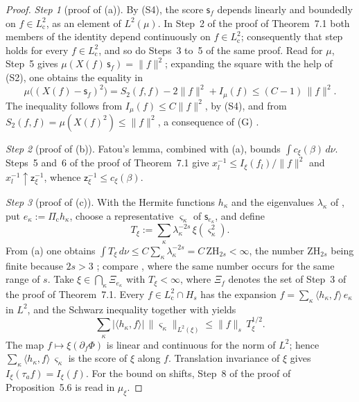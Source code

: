 \documentclass[11pt,letterpaper,reqno]{amsart}
\theoremstyle{definition}
\begin{document}
\begin{proof}
\emph{Step 1} (proof of (a)).
By (S4), the score $\mathsf s_f$ depends linearly and boundedly on $f\in L^2_{\mathrm c}$, as an element of $L^2(\mu)$.
In Step~2 of the proof of Theorem~7.1 both members of the identity depend continuously on $f\in L^2_{\mathrm c}$;
consequently that step holds for every $f\in L^2_{\mathrm c}$, and so do Steps~3 to~5 of the same proof.
Read for $\mu$, Step~5 gives $\mu(X(f)\,\mathsf s_f)=\|f\|^2$;
expanding the square with the help of (S2), one obtains the equality in
\begin{equation*}
\mu\bigl((X(f)-\mathsf s_f)^2\bigr)=S_2(f,f)-2\|f\|^2+I_\mu(f)\le(C-1)\,\|f\|^2.
\end{equation*}
The inequality follows from $I_\mu(f)\le C\|f\|^2$, by (S4), and from $S_2(f,f)=\mu(X(f)^2)\le\|f\|^2$, a consequence of (G) \cite[Lemma~14.3\,(a)]{QEDII}.

\emph{Step 2} (proof of (b)).
Fatou's lemma, combined with (a), bounds $\int c_\xi(\beta)\,d\nu$.
Steps~5 and~6 of the proof of Theorem~7.1 give $x_l^{-1}\le I_\xi(f_l)/\|f\|^2$ and $x_l^{-1}\uparrow\mathsf z_\xi^{-1}$, whence $\mathsf z_\xi^{-1}\le c_\xi(\beta)$.

\emph{Step 3} (proof of (c)).
With the Hermite functions $h_\kappa$ and the eigenvalues $\lambda_\kappa$ of \cite[(n8)]{QEDIII}, put $e_\kappa:=\Pi_{\mathrm c}h_\kappa$, choose a representative $\varsigma_\kappa$ of $\mathsf s_{e_\kappa}$, and define
\begin{equation*}
T_\xi:=\sum_\kappa\lambda_\kappa^{-2s}\,\xi(\varsigma_\kappa^2).
\end{equation*}
From (a) one obtains $\int T_\xi\,\allowbreak d\nu\le C\sum_\kappa\lambda_\kappa^{-2s}=\allowbreak C\,\allowbreak \mathrm{ZH}_{2s}<\infty$, the number $\mathrm{ZH}_{2s}$ being finite because $2s>3$ \cite[Section~7.1.5]{QEDI};
compare \cite[Proposition~45.1\,(3)]{QEDIII}, where the same number occurs for the same range of $s$.
Take $\xi\in\bigcap_\kappa\Xi_{e_\kappa}$ with $T_\xi<\infty$, where $\Xi_f$ denotes the set of Step~3 of the proof of Theorem~7.1.
Every $f\in L^2_{\mathrm c}\cap H_s$ has the expansion $f=\sum_\kappa\langle h_\kappa,f\rangle\,e_\kappa$ in $L^2$,
and the Schwarz inequality together with \cite[(n8)]{QEDIII} yields
\begin{equation*}
\sum_\kappa|\langle h_\kappa,f\rangle|\,\|\varsigma_\kappa\|_{L^2(\xi)}\le\|f\|_s\,T_\xi^{1/2}.
\end{equation*}
The map $f\mapsto\xi(\partial_f\Phi)$ is linear and continuous for the norm of $L^2$;
hence $\sum_\kappa\langle h_\kappa,f\rangle\,\varsigma_\kappa$ is the score of $\xi$ along $f$.
Translation invariance of $\xi$ gives $I_\xi(\tau_af)=I_\xi(f)$.
For the bound on shifts, Step~8 of the proof of Proposition~5.6 is read in $\mu_\xi$.


\end{proof}
\end{document}
